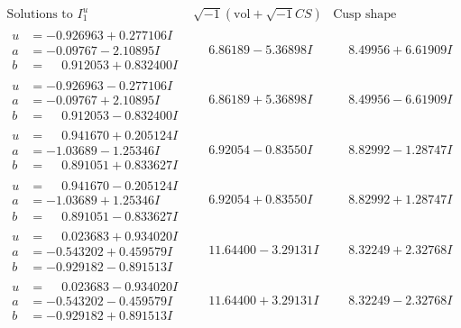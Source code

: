 \documentclass[1p]{elsarticle_modified}
\theoremstyle{definition}
\newcommand{\I}{\sqrt{-1}}
\begin{document}
$$\begin{array}{c|c|c}  
\text{Solutions to }I^u_{1}& \I (\text{vol} + \sqrt{-1}CS) & \text{Cusp shape}\\
 \hline 
\begin{aligned}
u &= -0.926963 + 0.277106 I \\
a &= -0.09767 - 2.10895 I \\
b &= \phantom{-}0.912053 + 0.832400 I\end{aligned}
 & \phantom{-}6.86189 - 5.36898 I & \phantom{-}8.49956 + 6.61909 I \\ \hline\begin{aligned}
u &= -0.926963 - 0.277106 I \\
a &= -0.09767 + 2.10895 I \\
b &= \phantom{-}0.912053 - 0.832400 I\end{aligned}
 & \phantom{-}6.86189 + 5.36898 I & \phantom{-}8.49956 - 6.61909 I \\ \hline\begin{aligned}
u &= \phantom{-}0.941670 + 0.205124 I \\
a &= -1.03689 - 1.25346 I \\
b &= \phantom{-}0.891051 + 0.833627 I\end{aligned}
 & \phantom{-}6.92054 - 0.83550 I & \phantom{-}8.82992 - 1.28747 I \\ \hline\begin{aligned}
u &= \phantom{-}0.941670 - 0.205124 I \\
a &= -1.03689 + 1.25346 I \\
b &= \phantom{-}0.891051 - 0.833627 I\end{aligned}
 & \phantom{-}6.92054 + 0.83550 I & \phantom{-}8.82992 + 1.28747 I \\ \hline\begin{aligned}
u &= \phantom{-}0.023683 + 0.934020 I \\
a &= -0.543202 + 0.459579 I \\
b &= -0.929182 - 0.891513 I\end{aligned}
 & \phantom{-}11.64400 - 3.29131 I & \phantom{-}8.32249 + 2.32768 I \\ \hline\begin{aligned}
u &= \phantom{-}0.023683 - 0.934020 I \\
a &= -0.543202 - 0.459579 I \\
b &= -0.929182 + 0.891513 I\end{aligned}
 & \phantom{-}11.64400 + 3.29131 I & \phantom{-}8.32249 - 2.32768 I \\ \hline\begin{aligned}

\end{aligned}
\end{array}$$
\end{document}
